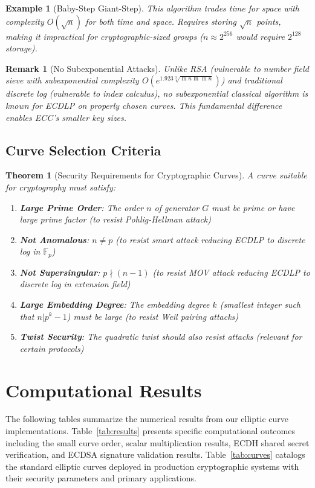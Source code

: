 \documentclass[a4paper, 11pt]{article}
\newtheorem{theorem}{Theorem}[section]
\newtheorem{example}{Example}[section]
\newtheorem{remark}{Remark}[section]
\begin{document}
\begin{example}[Baby-Step Giant-Step]
This algorithm trades time for space with complexity $O(\sqrt{n})$ for both time and space. Requires storing $\sqrt{n}$ points, making it impractical for cryptographic-sized groups ($n \approx 2^{256}$ would require $2^{128}$ storage).
\end{example}

\begin{remark}[No Subexponential Attacks]
Unlike RSA (vulnerable to number field sieve with subexponential complexity $O(e^{1.923\sqrt[3]{\ln n \ln \ln n}})$) and traditional discrete log (vulnerable to index calculus), no subexponential classical algorithm is known for ECDLP on properly chosen curves. This fundamental difference enables ECC's smaller key sizes.
\end{remark}

\subsection{Curve Selection Criteria}

\begin{theorem}[Security Requirements for Cryptographic Curves]
A curve suitable for cryptography must satisfy:
\begin{enumerate}
\item \textbf{Large Prime Order}: The order $n$ of generator $G$ must be prime or have large prime factor (to resist Pohlig-Hellman attack)
\item \textbf{Not Anomalous}: $n \neq p$ (to resist smart attack reducing ECDLP to discrete log in $\mathbb{F}_p$)
\item \textbf{Not Supersingular}: $p \nmid (n-1)$ (to resist MOV attack reducing ECDLP to discrete log in extension field)
\item \textbf{Large Embedding Degree}: The embedding degree $k$ (smallest integer such that $n | p^k - 1$) must be large (to resist Weil pairing attacks)
\item \textbf{Twist Security}: The quadratic twist should also resist attacks (relevant for certain protocols)
\end{enumerate}
\end{theorem}

\section{Computational Results}

The following tables summarize the numerical results from our elliptic curve implementations. Table~\ref{tab:results} presents specific computational outcomes including the small curve order, scalar multiplication results, ECDH shared secret verification, and ECDSA signature validation results. Table~\ref{tab:curves} catalogs the standard elliptic curves deployed in production cryptographic systems with their security parameters and primary applications.
\end{document}
